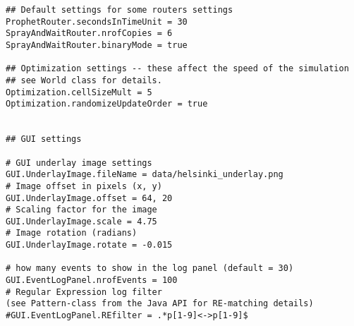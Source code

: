 \documentclass[11pt]{icsthesis}
\begin{document}
\begin{framed}
\begin{verbatim}
## Default settings for some routers settings
ProphetRouter.secondsInTimeUnit = 30
SprayAndWaitRouter.nrofCopies = 6
SprayAndWaitRouter.binaryMode = true

## Optimization settings -- these affect the speed of the simulation
## see World class for details.
Optimization.cellSizeMult = 5
Optimization.randomizeUpdateOrder = true


## GUI settings

# GUI underlay image settings
GUI.UnderlayImage.fileName = data/helsinki_underlay.png
# Image offset in pixels (x, y)
GUI.UnderlayImage.offset = 64, 20
# Scaling factor for the image
GUI.UnderlayImage.scale = 4.75
# Image rotation (radians)
GUI.UnderlayImage.rotate = -0.015

# how many events to show in the log panel (default = 30)
GUI.EventLogPanel.nrofEvents = 100
# Regular Expression log filter 
(see Pattern-class from the Java API for RE-matching details)
#GUI.EventLogPanel.REfilter = .*p[1-9]<->p[1-9]$
\end{verbatim}
\end{framed}
\end{document}
